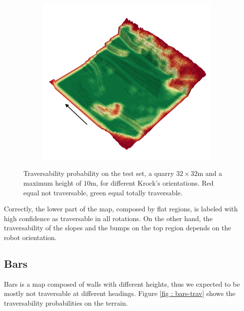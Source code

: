 \documentclass[../document.tex]{subfiles}
\begin{document}
\begin{figure} [htbp]
\begin{subfigure}[b]{0.45\textwidth}
\end{subfigure}
\begin{subfigure}[b]{0.45\textwidth}
    \includegraphics[width=\linewidth]{../img/4/traversability/quarry/-180.png}  
\end{subfigure}
\caption{Traversability probability on the test set, a quarry $32\times 32$m and a maximum height of $10$m, for different Krock's orientations. Red equal not traversable, green equal totally traversable. }
\label{fig : quarry-trav}
\end{figure}
 Correctly, the lower part of the map, composed by flat regions, is labeled with high confidence as traversable in all rotations. On the other hand, the traversability of the slopes and the bumps on the top region depends on the robot orientation.

\subsection{Bars}
Bars is a map composed of walls with different heights, thus we expected to be mostly not traversable at different headings. Figure \ref{fig : bars-trav} shows the traversability probabilities on the terrain.
\end{document}
